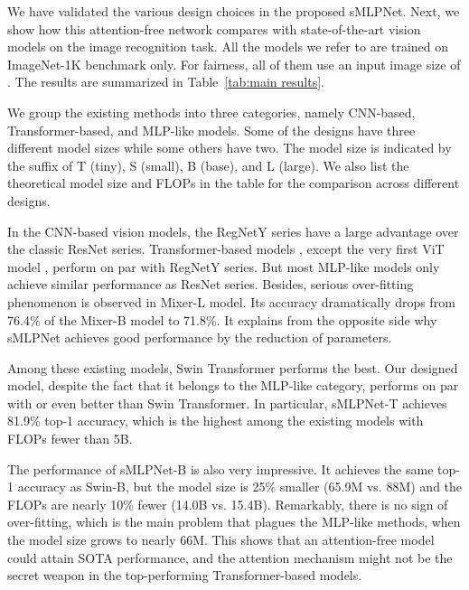 \documentclass[letterpaper]{article} \usepackage{aaai22}  \usepackage{times}  \usepackage{helvet}  \usepackage{courier}  \usepackage[hyphens]{url}  \usepackage{graphicx} \usepackage{color}
\begin{document}
We have validated the various design choices in the proposed sMLPNet. Next, we show how this attention-free network compares with state-of-the-art vision models on the image recognition task. All the models we refer to are trained on ImageNet-1K benchmark only. For fairness, all of them use an input image size of . The results are summarized in Table~\ref{tab:main results}. 

We group the existing methods into three categories, namely CNN-based, Transformer-based, and MLP-like models. Some of the designs have three different model sizes while some others have two. The model size is indicated by the suffix of T (tiny), S (small), B (base), and L (large). We also list the theoretical model size and FLOPs in the table for the comparison across different designs. 

In the CNN-based vision models, the RegNetY \cite{radosavovic2020designing} series have a large advantage over the classic ResNet series. Transformer-based models \cite{touvron2021training, zhou2021deepvit, liu2021swin}, except the very first ViT model \cite{dosovitskiy2020image}, perform on par with RegNetY series. But most MLP-like models \cite{touvron2021resmlp, liu2021pay} only achieve similar performance as ResNet series. Besides, serious over-fitting phenomenon is observed in Mixer-L model. Its accuracy dramatically drops from 76.4\% of the Mixer-B model to 71.8\%. It explains from the opposite side why sMLPNet achieves good performance by the reduction of parameters.

Among these existing models, Swin Transformer performs the best. Our designed model, despite the fact that it belongs to the MLP-like category, performs on par with or even better than Swin Transformer. In particular, sMLPNet-T achieves 81.9\% top-1 accuracy, which is the highest among the existing models with FLOPs fewer than 5B. 

The performance of sMLPNet-B is also very impressive. It achieves the same top-1 accuracy as Swin-B, but the model size is 25\% smaller (65.9M vs. 88M) and the FLOPs are nearly 10\% fewer (14.0B vs. 15.4B). Remarkably, there is no sign of over-fitting, which is the main problem that plagues the MLP-like methods, when the model size grows to nearly 66M. This shows that an attention-free model could attain SOTA performance, and the attention mechanism might not be the secret weapon in the top-performing Transformer-based models. 
\end{document}
